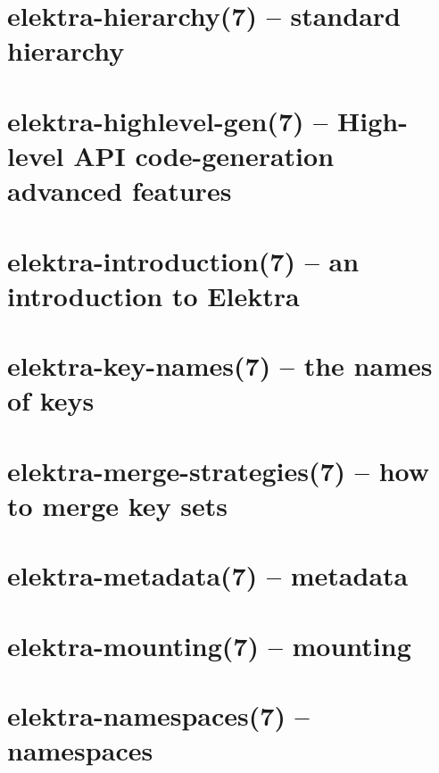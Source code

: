 \let\mypdfximage\pdfximage\def\pdfximage{\immediate\mypdfximage}\documentclass[twoside]{book}
\newcommand{\+}{\discretionary{\mbox{\scriptsize$\hookleftarrow$}}{}{}}
\begin{document}
\chapter{elektra-\/hierarchy(7) -- standard hierarchy}
\label{doc_help_elektra-hierarchy_md}

\chapter{elektra-\/highlevel-\/gen(7) -- High-\/level API code-\/generation advanced features}
\label{doc_help_elektra-highlevel-gen_md}

\chapter{elektra-\/introduction(7) -- an introduction to Elektra}
\label{doc_help_elektra-introduction_md}

\chapter{elektra-\/key-\/names(7) -- the names of keys}
\label{doc_help_elektra-key-names_md}

\chapter{elektra-\/merge-\/strategies(7) -- how to merge key sets}
\label{doc_help_elektra-merge-strategy_md}

\chapter{elektra-\/metadata(7) -- metadata}
\label{doc_help_elektra-metadata_md}

\chapter{elektra-\/mounting(7) -- mounting}
\label{doc_help_elektra-mounting_md}

\chapter{elektra-\/namespaces(7) -- namespaces}
\label{doc_help_elektra-namespaces_md}

\end{document}
